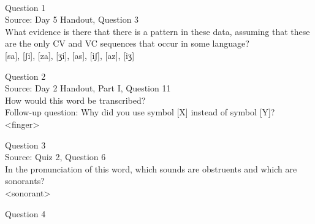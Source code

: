 \documentclass[12pt]{article}
\begin{document}
\newpage

\begin{center}
\textbf{{\color{red}{\HUGE END OF EXAM}}}\\

\end{center}
\newpage

\begin{center}
\textbf{{\color{blue}{\HUGE START OF EXAM\\}}}

\textbf{{\color{blue}{\HUGE Student ID: 5824\\}}}

\textbf{{\color{blue}{\HUGE 1:00 - 1:15 PM\\}}}

\end{center}
\newpage

{\large Question 1}\\

Source: Day 5 Handout, Question 3\\

What evidence is there that there is a pattern in these data, assuming that these are the only CV and VC sequences that occur in some language?\\

{[sa]}, {[ʃi]}, {[za]}, {[ʒi]}, {[as]}, {[iʃ]}, {[az]}, {[iʒ]}


\newpage

{\large Question 2}\\

Source: Day 2 Handout, Part I, Question 11\\

How would this word be transcribed?\\ Follow-up question: Why did you use symbol [X] instead of symbol [Y]?\\

<finger>


\newpage

{\large Question 3}\\

Source: Quiz 2, Question 6\\

In the pronunciation of this word, which sounds are obstruents and which are sonorants?\\

<sonorant>


\newpage

{\large Question 4}\\
\end{document}
